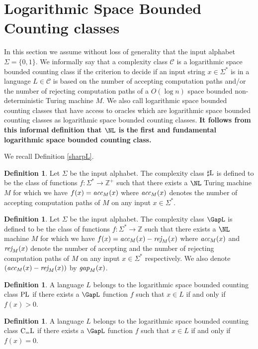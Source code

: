 \documentclass{amsbook}
\theoremstyle{definition}
\newtheorem{definition}[theorem]{Definition}
\theoremstyle{remark}
\numberwithin{section}{chapter}
\numberwithin{equation}{chapter}
\newcommand{\sharpL}{\mbox{$\sharp$\rm L}}
\newcommand{\CeqL}{\mbox{\rm C$_=$L}}
\renewcommand{\PL}{\mbox{\rm PL}}
\newcommand{\Z}{\mathbb{Z}}
\newcommand{\acc}{\mbox{\it acc}}
\newcommand{\rej}{\mbox{\it rej}}
\newcommand{\gap}{\mbox{\it gap}}
\begin{document}
\section{Logarithmic Space Bounded Counting classes}
In this section we assume without loss of generality that the input alphabet $\Sigma=\{ 0,1\}$. We informally say that a complexity class $\mathcal{C}$ is a logarithmic space bounded counting class if the criterion to decide if an input string $x\in\Sigma^*$ is in a language $L\in\mathcal{C}$ is based on the number of accepting computation paths and/or the number of rejecting computation paths of a $O(\log n)$ space bounded non-deterministic Turing machine $M$. We also call logarithmic space bounded counting classes that have access to oracles which are logarithmic space bounded counting classes as logarithmic space bounded counting classes. {\bf It follows from this informal definition that $\NL$ is the first and fundamental logarithmic space bounded counting class.}

We recall Definition \ref{sharpL}.
\begin{definition}
Let $\Sigma$ be the input alphabet. The complexity class $\sharpL$ is defined to be the class of functions $f:\Sigma^{*}\rightarrow\Z^{+}$ such that there exists a $\NL$ Turing machine $M$ for which we have $f(x)=\acc _M(x)$ where $\acc _M(x)$ denotes the number of accepting computation paths of $M$ on any input $x\in\Sigma^{*}$.
\end{definition}

\begin{definition}\label{GapL}
Let $\Sigma$ be the input alphabet. The complexity class $\GapL$ is defined to be the class of functions $f:\Sigma^{*}\rightarrow\Z$ such that there exists a $\NL$ machine $M$ for which we have $f(x)=\acc _M(x)-\rej _M(x)$ where $\acc _M(x)$ and $\rej _M(x)$ denote the number of accepting and the number of rejecting computation paths of $M$ on any input $x\in\Sigma^{*}$ respectively. We also denote $(\acc _M(x)-\rej _M(x))$ by $\gap _M(x)$.
\end{definition}

\begin{definition}\label{pldefinition}
A language $L$ belongs to the logarithmic space bounded counting class $\PL$ if there exists a $\GapL$ function $f$ such that $x\in L$ if and only if $f(x)>0$.
\end{definition}

\begin{definition}
A language $L$ belongs to the logarithmic space bounded counting class $\CeqL$ if there exists a $\GapL$ function $f$ such that $x\in L$ if and only if $f(x)=0$.
\end{definition}
\end{document}
